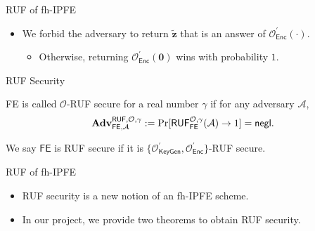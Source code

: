 \begin{frame}{RUF of fh-IPFE}

\begin{itemize}
	\item We forbid the adversary to return $\mathbf{\tilde{z}}$ that is an answer of $\mathcal{O}^\prime_{\textsf{Enc}}(\cdot)$.
	\begin{itemize}
		\item Otherwise, returning $\mathcal{O}^\prime_{\textsf{Enc}}(\mathbf{0})$ wins with probability $1$.
	\end{itemize}

\end{itemize}
\pause

\begin{definition}{RUF Security}

	\textsf{FE} is called $\mathcal{O}$-RUF secure for a real number $\gamma$ if for any adversary $\mathcal{A}$,
	\[
		\mathbf{Adv}_{\textsf{FE}, \mathcal{A}}^{\textsf{RUF}, \mathcal{O}, \gamma} := \Pr[\textsf{RUF}^{\mathcal{O}, \gamma}_{\textsf{FE}}(\mathcal{A}) \to 1 ] = \mathsf{negl}.
	\]

\noindent We say $\textsf{FE}$ is RUF secure if it is $\{ \mathcal{O}^\prime_{\textsf{KeyGen}}, \mathcal{O}^\prime_{\textsf{Enc}} \}$-RUF secure.

\end{definition}

\end{frame}


\begin{frame}{RUF of fh-IPFE}

\begin{itemize}

	\item<1-> RUF security is a new notion of an fh-IPFE scheme.

	\item<2-> In our project, we provide two theorems to obtain RUF security.

\end{itemize}




\end{frame}


